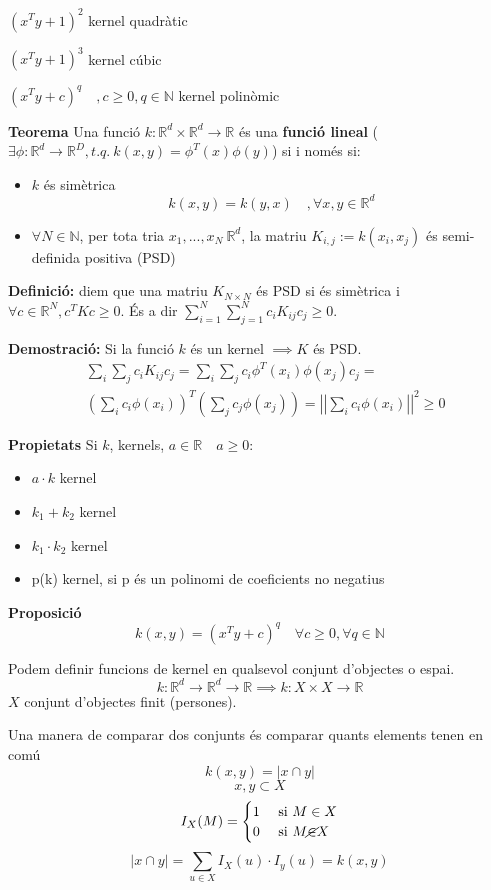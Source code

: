 \documentclass[a4paper]{article}
\begin{document}
$(x^Ty + 1)^2$ kernel quadràtic

$(x^Ty + 1)^3$ kernel cúbic

$(x^Ty + c)^q \quad ,c \ge 0, q \in \mathbb{N}$ kernel polinòmic

\textbf{Teorema} Una funció $k:\mathbb{R}^d \times \mathbb{R}^d \rightarrow \mathbb{R}$ és una \textbf{funció lineal} ($\exists \phi: \mathbb{R}^d \rightarrow \mathbb{R}^D, t.q. \ k(x,y) = \phi^T(x)\phi(y)$) si i només si:
\begin{itemize}
	\item $k$ és simètrica
	$$
		k(x,y) = k(y,x) \quad ,\forall x,y \in \mathbb{R}^d
	$$
	\item $\forall N \in \mathbb{N}$, per tota tria $x_1,...,x_N \ \mathbb{R}^d$, la matriu $K_{i,j} := k(x_i, x_j)$ és semi-definida positiva (PSD)
\end{itemize}

\textbf{Definició:} diem que una matriu $K_{N \times N}$ és PSD si és simètrica i $\forall c \in \mathbb{R}^N, c^T K c \ge 0$. És a dir $\sum_{i=1}^N\sum_{j=1}^N c_i K_{ij} c_j \ge 0$.

\textbf{Demostració:} Si la funció $k$ és un kernel $\implies K$ és PSD.
\begin{align*}
	& \sum_i \sum_j c_i K_{ij} c_j = 
	\sum_i \sum_j c_i \phi^T(x_i) \phi(x_j)c_j = \\
	& \left( \sum_i c_i \phi(x_i) \right)^T
	\left( \sum_j c_j \phi(x_j) \right) = 
	\left|\left| \sum_i c_i \phi(x_i) \right|\right|^2 \ge 0
\end{align*}

\textbf{Propietats}
Si $k$, kernels, $a \in \mathbb{R} \quad a \ge 0$:
\begin{itemize}
	\item $a·k$ kernel
	\item $k_1 + k_2$ kernel
	\item $k_1·k_2$ kernel
	\item p(k) kernel, si p és un polinomi de coeficients no negatius
\end{itemize}

\textbf{Proposició}
$$
k(x,y) = (x^Ty + c)^q \quad \forall c \ge 0, \forall q \in \mathbb{N}
$$

Podem definir funcions de kernel en qualsevol conjunt d'objectes o espai.
$$
k: \mathbb{R}^d \rightarrow \mathbb{R}^d 
\rightarrow \mathbb{R} \implies 
k: X \times X \rightarrow \mathbb{R}
$$
$X$ conjunt d'objectes finit (persones).

Una manera de comparar dos conjunts és comparar quants elements tenen en comú
$$
k(x,y) = | x \cap y|
$$
$$
x,y \subset X
$$
$$
I_X (M) = \begin{cases}
1 & \text{ si } M \in X \\
0 & \text{ si } M \cancel{\in} X
\end{cases}
$$
$$
|x \cap y| = \sum_{u \in X} I_X(u)·I_y(u) = k(x,y)
$$
\end{document}
